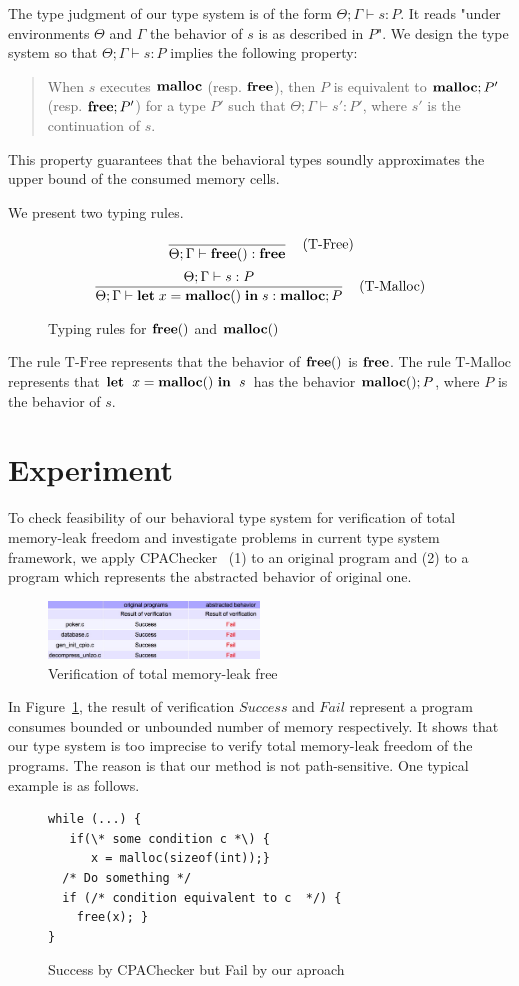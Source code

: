 \documentclass{sigplanconf}
\begin{document}
The type judgment of our type system is of the form $\Theta;\Gamma\vdash s :
P$.  It reads "under environments \(\Theta\) and  \(\Gamma\) the behavior
of \(s\) is as described in \(P\)".  We design the type system so that
\(\Theta;\Gamma \vdash s : P\) implies the following property:
\begin{quotation}
When \(s\) executes \(\mathbf{malloc}\) (resp. \(\mathbf{free}\)), then \(P\) is
equivalent to \(\mathbf{malloc};P'\) (resp. \(\mathbf{free};P'\)) for a type \(P'\)
such that \(\Theta;\Gamma \vdash s' : P'\), where \(s'\) is the continuation
of \(s\).
\end{quotation}
This property guarantees that the behavioral types soundly
approximates the upper bound of the consumed memory cells.

We present two typing rules. 
\begin{figure}[t]
$$ \frac{}
{\Theta;\Gamma \vdash \mathbf{free}() : \mathbf{free}} 
\; \; \; \; \mbox{(T-Free)} $$
$$ \frac{\Theta;\Gamma \vdash s : P}
{\Theta;\Gamma \vdash \mathbf{let}\; x = \mathbf{malloc()} \; \mathbf{in}\; s  : \mathbf{malloc};P} 
\; \; \; \; \mbox{(T-Malloc)} $$
\caption{Typing rules for $\mathbf{free}()$ and $\mathbf{malloc()}$ }
\end{figure}
The rule $\mbox{T-Free}$ represents that the behavior of \(\mathbf{free}()\)
is \(\mathbf{free}\). The rule $\mbox{T-Malloc}$ represents that \(\mathbf{let}\;\ x =
\mathbf{malloc()}\ \mathbf{in}\;\ s\) has the behavior \(\mathbf{malloc()};P\), where \(P\) is the
behavior of \(s\).

\section{Experiment}
To check feasibility of our behavioral type system for verification of
total memory-leak freedom and investigate problems in current type
system framework, we apply CPAChecker~\cite{beyer2011cpachecker} (1)
to an original program and (2) to a program which represents the
abstracted behavior of original one.

\begin{figure}[!hbp]
\centering
\includegraphics[width=0.5\textwidth]{exp.png} 
\caption{Verification of total memory-leak free}
\label{figexp} 
\end{figure}

In Figure~\ref{figexp}, the result of verification \(Success\) and
\(Fail\) represent a program consumes bounded or unbounded number of
memory respectively. It shows that our type system is too imprecise to
verify total memory-leak freedom of the programs. The reason is that
our method is not path-sensitive. One typical example is as follows.
\begin{figure}[h]
\begin{verbatim}
while (...) {
   if(\* some condition c *\) {
      x = malloc(sizeof(int));}
  /* Do something */
  if (/* condition equivalent to c  */) {
    free(x); }
}
\end{verbatim}
\caption{Success by CPAChecker but Fail by our aproach}
\label{ex:fail}
\end{figure}
\end{document}
